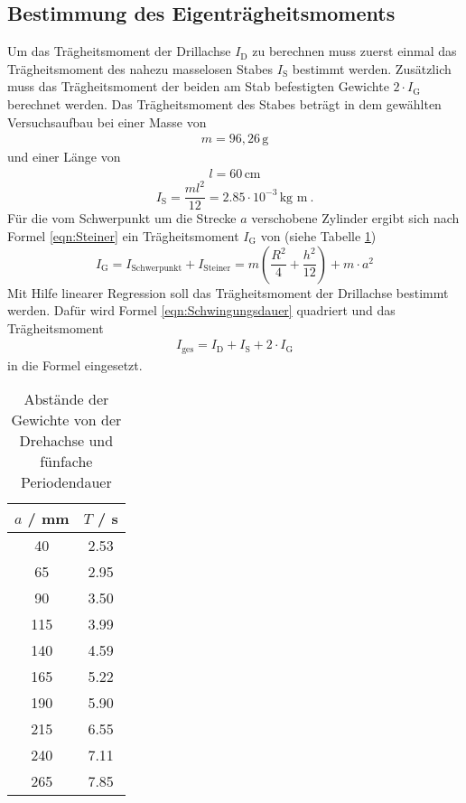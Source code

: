 \subsection{Bestimmung des Eigenträgheitsmoments}
Um das Trägheitsmoment der Drillachse $I_\text{D}$ zu berechnen muss zuerst einmal das Trägheitsmoment des nahezu masselosen Stabes $I_\text{S}$ bestimmt werden. Zusätzlich muss das Trägheitsmoment der beiden am Stab befestigten Gewichte $2 \cdot I_\text{G}$ berechnet werden. Das Trägheitsmoment des Stabes beträgt in dem gewählten Versuchsaufbau bei einer Masse von
\begin{align*}
	m = 96,26 \, \text{g}
\end{align*}
und einer Länge von
\begin{align*}
	l = 60 \, \text{cm}
\end{align*}
\begin{equation}
	I_\text{S} = \frac{ml^2}{12}= 2.85 \cdot 10^{-3} \, \text{kg m} \ .
\end{equation}
Für die vom Schwerpunkt um die Strecke $a$ verschobene Zylinder ergibt sich nach Formel \ref{eqn:Steiner} ein Trägheitsmoment $I_\text{G}$ von (siehe Tabelle \ref{tab:I_D})
\begin{equation}
	I_\text{G}= I_\text{Schwerpunkt}+ I_\text{Steiner} = m (\frac{R^2}{4} + \frac{h^2}{12}) + m \cdot a^{2}
\end{equation}
Mit Hilfe linearer Regression soll das Trägheitsmoment der Drillachse bestimmt werden. Dafür wird Formel \ref{eqn:Schwingungsdauer} quadriert und das Trägheitsmoment
\begin{align*}
	I_\text{ges} = I_\text{D} + I_\text{S} + 2 \cdot I_\text{G}
\end{align*}
in die Formel eingesetzt.
\begin{table}[ht]
        \centering
        \caption{Abstände der Gewichte von der Drehachse und fünfache Periodendauer}
        \label{tab:I_D}
        \begin{tabular}{c c}
                \toprule
                $a$ / mm & $T$ / s  \\
                \midrule
                40 & 2.53  \\
                65 & 2.95  \\
                90 & 3.50  \\
                115& 3.99  \\
                140& 4.59  \\
                165& 5.22  \\
                190& 5.90  \\
                215& 6.55  \\
                240& 7.11  \\
                265& 7.85  \\

                \bottomrule
        \end{tabular}
\end{table}
